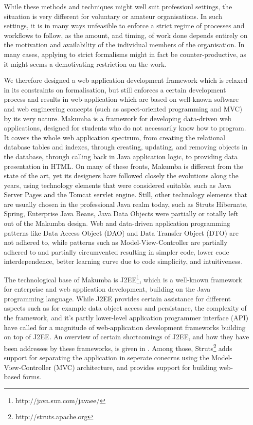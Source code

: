 \documentclass{llncs}
\begin{document}
While these methods and techniques might well suit professionl settings, the situation is very different for voluntary or amateur organisations. In such settings, it is in many ways unfeasible to enforce a strict regime of processes and workflows to follow, as the amount, and timing, of work done depends entirely on the motivation and availability of the individual members of the organisation. In many cases, applying to strict formalisms might in fact be counter-productive, as it might seems a demotivating restriction on the work.

We therefore designed a web application development framework which is relaxed in its constraints on formalisation, but still enforces a certain development process and results in web-application which are based on well-known software and web engineering concepts (such as aspect-oriented programming and MVC) by its very nature. 
Makumba is a framework for developing data-driven web applications, designed for students who do not necessarily know how to program. It covers the whole  web application spectrum, from creating the relational database tables and indexes, through creating, updating, and removing objects in the database, through calling back in Java application logic, to providing data presentation in HTML. On many of these fronts, Makumba is different from the state of the art, yet its designers have followed closely the evolutions along the years, using technology elements that were considered suitable, such as Java Server Pages and the Tomcat servlet engine. Still, other technology elements that are usually chosen in the professional Java realm today, such as Struts
Hibernate, Spring, Enterprise Java Beans, Java Data Objects were partially or totally left out of the Makumba design. Web and data-driven application programming patterns like Data Access Object (DAO) and Data Transfer Object (DTO) are not adhered to, while patterns such as Model-View-Controller are partially adhered to and partially circumvented resulting in simpler code, lower code interdependence, better learning curve due to code simplicity, and intuitiveness. 

The technological base of Makumba is J2EE\footnote{http://java.sun.com/javaee/}, which is a well-known framework for enterprise and web application development, building on the Java programming language. While J2EE provides certain assistance for different aspects such as for example data object access and persistance, the complexity of the framework, and it's partly lower-level application programmer interface (API) have called for a magnitude of web-application development frameworks building on top of J2EE. An overview of certain shortcomings of J2EE, and how they have been addresses by these frameworks, is given in \cite{johnson2005jdf}. Among those, Struts\footnote{http://struts.apache.org} adds support for separating the application in seperate conecrns using the Model-View-Controller (MVC) architecture, and provides support for building web-based forms. 
\end{document}
